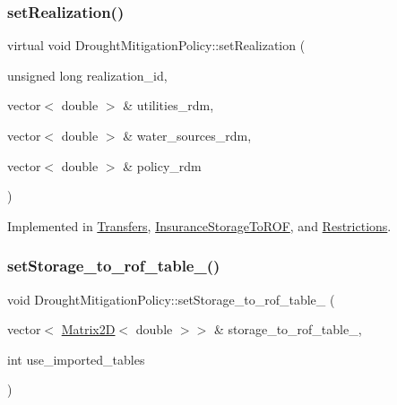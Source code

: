 \subsubsection{\texorpdfstring{set\+Realization()}{setRealization()}}
{\footnotesize\ttfamily virtual void Drought\+Mitigation\+Policy\+::set\+Realization (\begin{DoxyParamCaption}\item[{unsigned long}]{realization\+\_\+id,  }\item[{vector$<$ double $>$ \&}]{utilities\+\_\+rdm,  }\item[{vector$<$ double $>$ \&}]{water\+\_\+sources\+\_\+rdm,  }\item[{vector$<$ double $>$ \&}]{policy\+\_\+rdm }\end{DoxyParamCaption})\hspace{0.3cm}{\ttfamily [pure virtual]}}



Implemented in \mbox{\hyperlink{classTransfers_a75342a7c14b2ff69eb2520de240a1131}{Transfers}}, \mbox{\hyperlink{classInsuranceStorageToROF_a6318c3dca8b0c4d568eac494e5ccf712}{Insurance\+Storage\+To\+R\+OF}}, and \mbox{\hyperlink{classRestrictions_abc17a8a403311933a3bb58fbecd5f5fd}{Restrictions}}.

\mbox{\label{classDroughtMitigationPolicy_a75710a6ab73213223222b3472f9251c0}} 
\subsubsection{\texorpdfstring{set\+Storage\+\_\+to\+\_\+rof\+\_\+table\+\_\+()}{setStorage\_to\_rof\_table\_()}}
{\footnotesize\ttfamily void Drought\+Mitigation\+Policy\+::set\+Storage\+\_\+to\+\_\+rof\+\_\+table\+\_\+ (\begin{DoxyParamCaption}\item[{vector$<$ \mbox{\hyperlink{classMatrix2D}{Matrix2D}}$<$ double $>$$>$ \&}]{storage\+\_\+to\+\_\+rof\+\_\+table\+\_\+,  }\item[{int}]{use\+\_\+imported\+\_\+tables }\end{DoxyParamCaption})}



